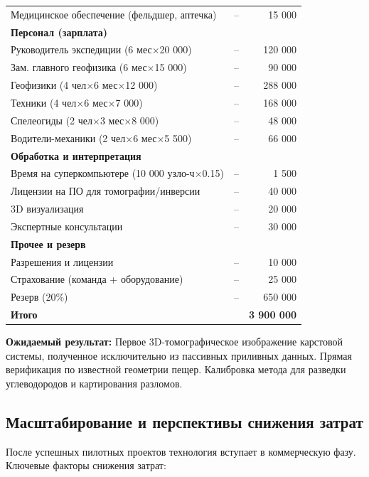 \documentclass[12pt,a4paper]{article}
\theoremstyle{remark}
\begin{document}
\begin{table}[htbp]
\begin{tabular}{lrr}
			Медицинское обеспечение (фельдшер, аптечка) & – & 15 000 \\
			\multicolumn{3}{l}{\textbf{Персонал (зарплата)}} \\
			Руководитель экспедиции (6 мес$\times$20 000) & – & 120 000 \\
			Зам. главного геофизика (6 мес$\times$15 000) & – & 90 000 \\
			Геофизики (4 чел$\times$6 мес$\times$12 000) & – & 288 000 \\
			Техники (4 чел$\times$6 мес$\times$7 000) & – & 168 000 \\
			Спелеогиды (2 чел$\times$3 мес$\times$8 000) & – & 48 000 \\
			Водители-механики (2 чел$\times$6 мес$\times$5 500) & – & 66 000 \\
			\multicolumn{3}{l}{\textbf{Обработка и интерпретация}} \\
			Время на суперкомпьютере (10 000 узло-ч$\times$0.15) & – & 1 500 \\
			Лицензии на ПО для томографии/инверсии & – & 40 000 \\
			3D визуализация & – & 20 000 \\
			Экспертные консультации & – & 30 000 \\
			\multicolumn{3}{l}{\textbf{Прочее и резерв}} \\
			Разрешения и лицензии & – & 10 000 \\
			Страхование (команда + оборудование) & – & 25 000 \\
			Резерв (20\%) & – & 650 000 \\
			\midrule
			\textbf{Итого} & & \textbf{3 900 000} \\
			\bottomrule
		\end{tabular}
	\end{table}
	
	\textbf{Ожидаемый результат:} Первое 3D-томографическое изображение карстовой системы, полученное исключительно из пассивных приливных данных. Прямая верификация по известной геометрии пещер. Калибровка метода для разведки углеводородов и картирования разломов.
	
	\subsection{Масштабирование и перспективы снижения затрат}
	
	После успешных пилотных проектов технология вступает в коммерческую фазу. Ключевые факторы снижения затрат:
	
\end{document}
